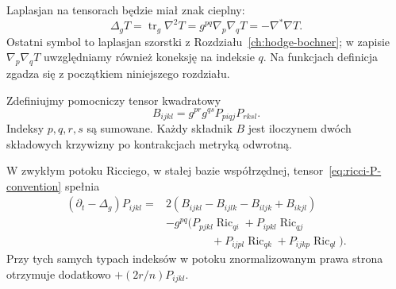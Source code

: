 Laplasjan na tensorach będzie miał znak cieplny:
\[
 \Delta_gT=\operatorname{tr}_g\nabla^2T
          =g^{pq}\nabla_p\nabla_qT
          =-\nabla^*\nabla T.
\]
Ostatni symbol to laplasjan szorstki z
Rozdziału~\ref{ch:hodge-bochner}; w zapisie
$\nabla_p\nabla_qT$ uwzględniamy również koneksję
na indeksie $q$. Na funkcjach definicja zgadza
się z początkiem niniejszego rozdziału.

Zdefiniujmy pomocniczy tensor kwadratowy
\begin{equation}\label{eq:ricci-B-definition}
 B_{ijkl}=g^{pr}g^{qs}P_{piqj}P_{rksl}.
\end{equation}
Indeksy $p,q,r,s$ są sumowane. Każdy składnik $B$
jest iloczynem dwóch składowych krzywizny po
kontrakcjach metryką odwrotną.

\begin{twierdzenie}
\label{thm:ricci-riemann-evolution}
W zwykłym potoku Ricciego, w stałej bazie
współrzędnej, tensor~\eqref{eq:ricci-P-convention}
spełnia
\begin{equation}\label{eq:ricci-riemann-evolution}
 \begin{aligned}
 (\partial_t-\Delta_g)P_{ijkl}
 ={}&2(B_{ijkl}-B_{ijlk}-B_{iljk}+B_{ikjl})\\
 &-g^{pq}\bigl(
       P_{pjkl}\operatorname{Ric}_{qi}
      +P_{ipkl}\operatorname{Ric}_{qj}\\
 &\hspace{49pt}
      +P_{ijpl}\operatorname{Ric}_{qk}
      +P_{ijkp}\operatorname{Ric}_{ql}\bigr).
 \end{aligned}
\end{equation}
Przy tych samych typach indeksów w potoku
znormalizowanym prawa strona otrzymuje dodatkowo
$+(2r/n)P_{ijkl}$.
\end{twierdzenie}
